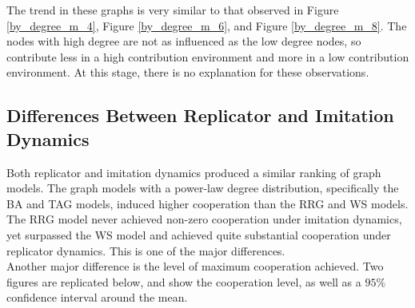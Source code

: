 The trend in these graphs is very similar to that observed in Figure \ref{by_degree_m_4}, Figure \ref{by_degree_m_6}, and Figure \ref{by_degree_m_8}. The nodes with high degree are not as influenced as the low degree nodes, so contribute less in a high contribution environment and more in a low contribution environment. At this stage, there is no explanation for these observations.

\subsection{Differences Between Replicator and Imitation Dynamics}

Both replicator and imitation dynamics produced a similar ranking of graph models. The graph models with a power-law degree distribution, specifically the BA and TAG models, induced higher cooperation than the RRG and WS models. The RRG model never achieved non-zero cooperation under imitation dynamics, yet surpassed the WS model and achieved quite substantial cooperation under replicator dynamics. This is one of the major differences. \\

Another major difference is the level of maximum cooperation achieved. Two figures are replicated below, and show the cooperation level, as well as a $95\%$ confidence interval around the mean. \\

